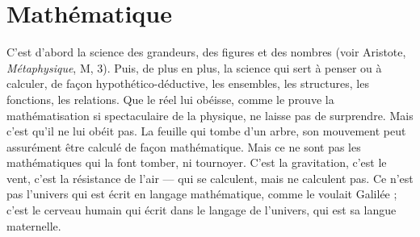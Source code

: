 \section{Mathématique}
C’est d’abord la science des grandeurs, des figures et
des nombres (voir Aristote, {\it Métaphysique}, M, 3). Puis,
de plus en plus, la science qui sert à penser ou à calculer, de façon hypothético-déductive,
les ensembles, les structures, les fonctions, les relations. Que le réel
lui obéisse, comme le prouve la mathématisation si spectaculaire de la physique,
ne laisse pas de surprendre. Mais c’est qu’il ne lui obéit pas. La feuille qui
tombe d’un arbre, son mouvement peut assurément être calculé de façon
mathématique. Mais ce ne sont pas les mathématiques qui la font tomber, ni
tournoyer. C’est la gravitation, c’est le vent, c’est la résistance de l’air — qui se
calculent, mais ne calculent pas.
Ce n’est pas l’univers qui est écrit en langage mathématique, comme le
voulait Galilée ; c’est le cerveau humain qui écrit dans le langage de l’univers,
qui est sa langue maternelle.

